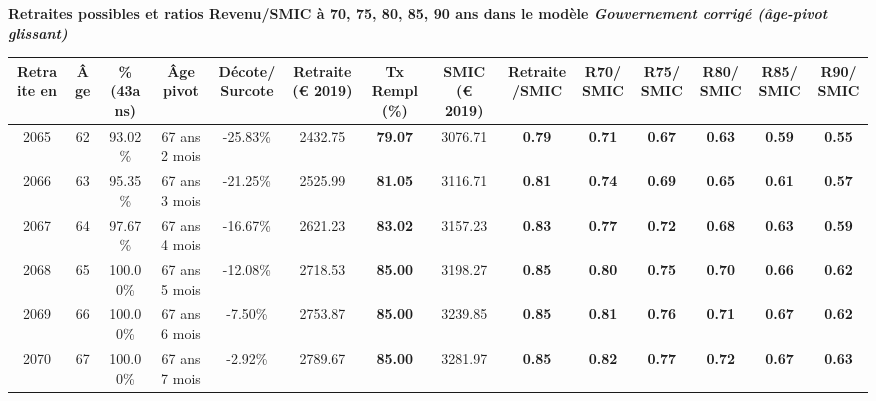  \vspace{0.1cm} 
{\bf \noindent Retraites possibles et ratios Revenu/SMIC à 70, 75, 80, 85, 90 ans dans le modèle \emph{Gouvernement corrigé (âge-pivot glissant)}}  
 
\begin{adjustbox}{max width=\textwidth} 
\begin{tabular}[htb]{|c|c||c|c|c||c|c||c|c||c|c|c|c|c|} 
\hline 
 Retraite en &  Âge &  \%(43ans) &  Âge pivot &  Décote/Surcote &  Retraite (\euro{} 2019) &  Tx Rempl(\%) &  SMIC (\euro{} 2019) &  Retraite/SMIC &  R70/SMIC &  R75/SMIC &  R80/SMIC &  R85/SMIC &  R90/SMIC \\ 
\hline \hline 
 2065 &  62 &  93.02\% &  67 ans 2 mois &  -25.83\% &  2432.75 &  {\bf 79.07} &  3076.71 &  {\bf {\color{red} 0.79}} &  {\bf {\color{red} 0.71}} &  {\bf {\color{red} 0.67}} &  {\bf {\color{red} 0.63}} &  {\bf {\color{red} 0.59}} &  {\bf {\color{red} 0.55}} \\ 
\hline 
 2066 &  63 &  95.35\% &  67 ans 3 mois &  -21.25\% &  2525.99 &  {\bf 81.05} &  3116.71 &  {\bf {\color{red} 0.81}} &  {\bf {\color{red} 0.74}} &  {\bf {\color{red} 0.69}} &  {\bf {\color{red} 0.65}} &  {\bf {\color{red} 0.61}} &  {\bf {\color{red} 0.57}} \\ 
\hline 
 2067 &  64 &  97.67\% &  67 ans 4 mois &  -16.67\% &  2621.23 &  {\bf 83.02} &  3157.23 &  {\bf {\color{red} 0.83}} &  {\bf {\color{red} 0.77}} &  {\bf {\color{red} 0.72}} &  {\bf {\color{red} 0.68}} &  {\bf {\color{red} 0.63}} &  {\bf {\color{red} 0.59}} \\ 
\hline 
 2068 &  65 &  100.00\% &  67 ans 5 mois &  -12.08\% &  2718.53 &  {\bf 85.00} &  3198.27 &  {\bf {\color{red} 0.85}} &  {\bf {\color{red} 0.80}} &  {\bf {\color{red} 0.75}} &  {\bf {\color{red} 0.70}} &  {\bf {\color{red} 0.66}} &  {\bf {\color{red} 0.62}} \\ 
\hline 
 2069 &  66 &  100.00\% &  67 ans 6 mois &  -7.50\% &  2753.87 &  {\bf 85.00} &  3239.85 &  {\bf {\color{red} 0.85}} &  {\bf {\color{red} 0.81}} &  {\bf {\color{red} 0.76}} &  {\bf {\color{red} 0.71}} &  {\bf {\color{red} 0.67}} &  {\bf {\color{red} 0.62}} \\ 
\hline 
 2070 &  67 &  100.00\% &  67 ans 7 mois &  -2.92\% &  2789.67 &  {\bf 85.00} &  3281.97 &  {\bf {\color{red} 0.85}} &  {\bf {\color{red} 0.82}} &  {\bf {\color{red} 0.77}} &  {\bf {\color{red} 0.72}} &  {\bf {\color{red} 0.67}} &  {\bf {\color{red} 0.63}} \\ 
\hline 
\hline 
\end{tabular} 
\end{adjustbox} 
 

